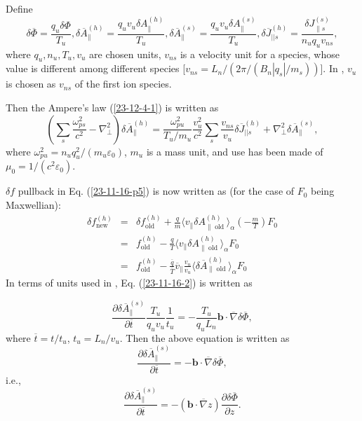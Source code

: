 \documentclass{article}
\newcommand{\tmop}[1]{\ensuremath{\operatorname{#1}}}
\newcommand{\tmtexttt}[1]{\text{{\ttfamily{#1}}}}
\begin{document}
Define
\begin{equation}
  \delta \overline{\Phi} = \frac{q_u \delta \Phi}{T_u}, \delta
  \overline{A}_{\parallel}^{(h)} = \frac{q_u v_u \delta
  A_{\parallel}^{(h)}}{T_u}, \delta \overline{A}_{\parallel}^{(s)} = \frac{q_u
  v_u \delta A_{\parallel}^{(s)}}{T_u}, \delta \overline{J}_{|| s}^{(h)} =
  \frac{\delta J_{\parallel s}^{(s)}}{n_u q_u v_{n s}},
\end{equation}
where $q_u, n_u, T_u, v_u$ are chosen units, $v_{n s}$ is a velocity unit for
a species, whose value is different among different species [$v_{n s} = L_n /
(2 \pi / (B_n | q_s | / m_s))$]. In \tmtexttt{TEK}, $v_u$ is chosen as $v_{n
s}$ of the first ion species.

Then the Ampere's law (\ref{23-12-4-1}) is written as
\begin{equation}
  \left( \sum_s \frac{\omega_{p s}^2}{c^2} - \nabla^2_{\perp} \right) \delta
  \overline{A}_{\parallel}^{(h)} = \frac{\omega_{p u}^2}{T_u / m_u}
  \frac{v_u^2}{c^2} \sum_s \frac{v_{n s}}{v_u} \delta \overline{J}_{||
  s}^{(h)} + \nabla^2_{\perp} \delta \overline{A}_{\parallel}^{(s)},
\end{equation}
where $\omega_{p u}^2 = n_u q_u^2 / (m_u \varepsilon_0)$, $m_u$ is a mass
unit, and use has been made of $\mu_0 = 1 / (c^2 \varepsilon_0)$.

$\delta f$ pullback in Eq. (\ref{23-11-16-p5}) is now written as (for the case
of $F_0$ being Maxwellian):
\begin{eqnarray}
  \delta f^{(h)}_{\tmop{new}} & = & \delta f^{(h)}_{\tmop{old}} + \frac{q}{m}
  \langle v_{\parallel} \delta A_{\parallel \tmop{old}}^{(h)} \rangle_{\alpha}
  \left( - \frac{m}{T} \right) F_0 \nonumber\\
  & = & f^{(h)}_{\tmop{old}} - \frac{q}{T} \langle v_{\parallel} \delta
  A_{\parallel \tmop{old}}^{(h)} \rangle_{\alpha} F_0 \nonumber\\
  & = & f^{(h)}_{\tmop{old}} - \frac{\overline{q}}{\overline{T}}
  \overline{v}_{\parallel} \frac{v_n}{v_u} \langle \delta
  \overline{A}_{\parallel \tmop{old}}^{(h)} \rangle_{\alpha} F_0 
\end{eqnarray}
In terms of units used in \tmtexttt{TEK}, Eq. (\ref{23-11-16-2}) is written as


\[ \frac{\partial \delta \overline{A}_{\parallel}^{(s)}}{\partial
   \overline{t}} \frac{T_u}{q_u v_u}  \frac{1}{t_u} = - \frac{T_u}{q_u L_n}
   \mathbf{b} \cdot \overline{\nabla} \delta \overline{\Phi}, \]
where $\overline{t} = t / t_u$, $t_u = L_n / v_u$. Then the above equation is
written as
\begin{equation}
  \frac{\partial \delta \overline{A}_{\parallel}^{(s)}}{\partial \overline{t}}
  = -\mathbf{b} \cdot \overline{\nabla} \delta \overline{\Phi},
\end{equation}
i.e.,
\begin{equation}
  \frac{\partial \delta \overline{A}_{\parallel}^{(s)}}{\partial \overline{t}}
  = - (\mathbf{b} \cdot \overline{\nabla} z) \frac{\partial \delta
  \overline{\Phi}}{\partial z} .
\end{equation}
\end{document}
